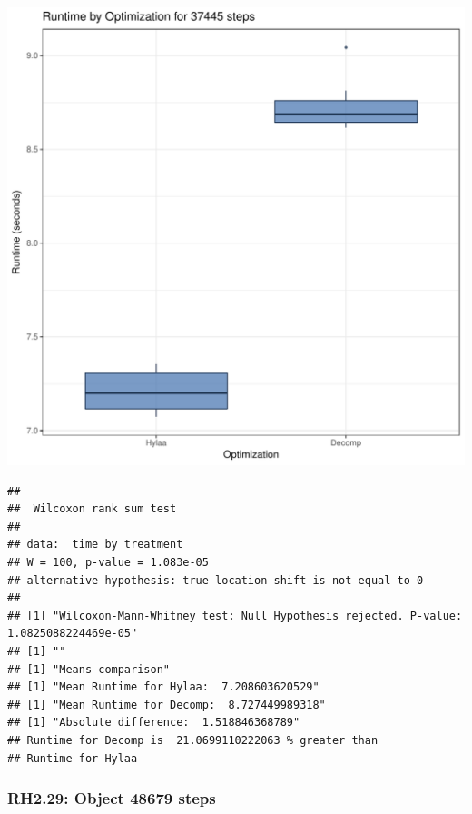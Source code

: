 \documentclass{article}\usepackage[]{graphicx}\usepackage[]{color}
\makeatletter
\def\maxwidth{ %
  \ifdim\Gin@nat@width>\linewidth
    \linewidth
  \else
    \Gin@nat@width
  \fi
}
\newenvironment{kframe}{%
 \def\at@end@of@kframe{}%
 \ifinner\ifhmode%
  \def\at@end@of@kframe{\end{minipage}}%
  \begin{minipage}{\columnwidth}%
 \fi\fi%
 \def\FrameCommand##1{\hskip\@totalleftmargin \hskip-\fboxsep
 \colorbox{shadecolor}{##1}\hskip-\fboxsep
     \hskip-\linewidth \hskip-\@totalleftmargin \hskip\columnwidth}%
 \MakeFramed {\advance\hsize-\width
   \@totalleftmargin\z@ \linewidth\hsize
   \@setminipage}}%
 {\par\unskip\endMakeFramed%
 \at@end@of@kframe}
\newenvironment{knitrout}{}{} %
\makeatother
\begin{document}
\begin{knitrout}
\color{fgcolor}
\includegraphics[width=\maxwidth]{figure/RH2_steps37445-1} 
\begin{kframe}\begin{verbatim}
## 
## 	Wilcoxon rank sum test
## 
## data:  time by treatment
## W = 100, p-value = 1.083e-05
## alternative hypothesis: true location shift is not equal to 0
## 
## [1] "Wilcoxon-Mann-Whitney test: Null Hypothesis rejected. P-value: 1.0825088224469e-05"
## [1] ""
## [1] "Means comparison"
## [1] "Mean Runtime for Hylaa:  7.208603620529"
## [1] "Mean Runtime for Decomp:  8.727449989318"
## [1] "Absolute difference:  1.518846368789"
## Runtime for Decomp is  21.0699110222063 % greater than 
## Runtime for Hylaa
\end{verbatim}
\end{kframe}
\end{knitrout}


\subsubsection{RH2.29: Object 48679 steps}
\end{document}

